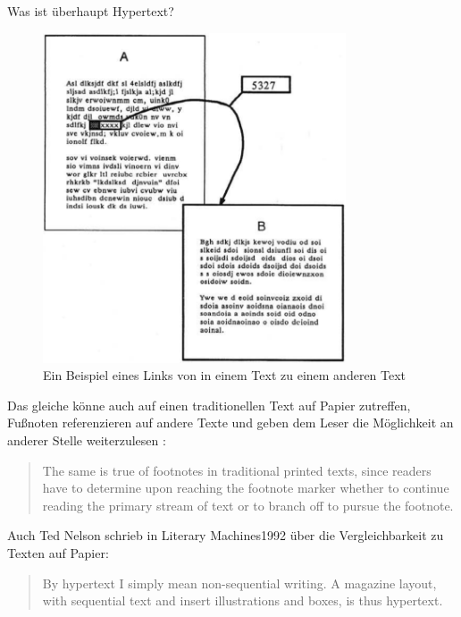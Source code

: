 \begin{section}{Was ist überhaupt Hypertext?}
\begin{figure}[H]
	\centering
	\includegraphics[width=0.8\textwidth]{image/imText}
	\caption{Ein Beispiel eines Links von in einem Text zu einem anderen Text \cite[S.34]{Conklin1987}}
	\label{fig:imText}
\end{figure}

Das gleiche könne auch auf einen traditionellen Text auf Papier zutreffen, Fußnoten referenzieren auf andere Texte und geben dem Leser die Möglichkeit an anderer Stelle weiterzulesen \cite{Nielsen1995}:

\begin{quote}
    \glqq The same is true of footnotes in traditional printed texts, since readers have to determine upon reaching the footnote marker whether to continue reading the primary stream of text or to branch off to pursue the footnote. \grqq{ }\cite{Nielsen1995}
\end{quote}

Auch Ted Nelson schrieb in \glqq Literary Machines\grqq{ }1992 über die Vergleichbarkeit zu Texten auf Papier:

\begin{quote}
\glqq By hypertext I simply mean non-sequential writing. A magazine layout, with sequential text and insert illustrations and boxes, is thus hypertext.\grqq{ }\cite{Nelson1992}
\end{quote} 

\end{section}

